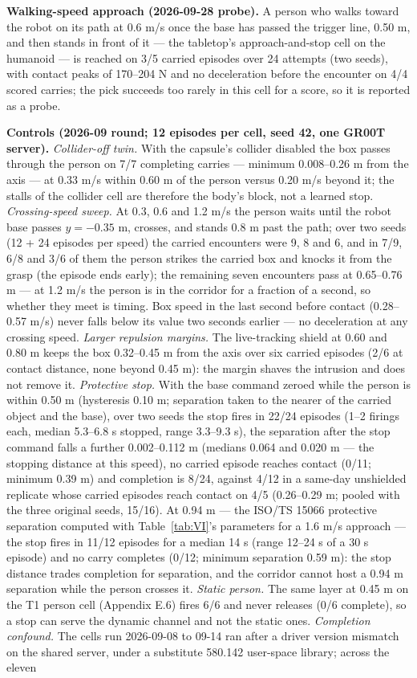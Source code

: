 \textbf{Walking-speed approach (2026-09-28 probe).} A person who walks toward the robot on its path at 0.6 m/s once the base has passed the trigger line, 0.50 m, and then stands in front of it --- the tabletop's approach-and-stop cell on the humanoid --- is reached on 3/5 carried episodes over 24 attempts (two seeds), with contact peaks of 170--204 N and no deceleration before the encounter on 4/4 scored carries; the pick succeeds too rarely in this cell for a score, so it is reported as a probe.

\textbf{Controls (2026-09 round; 12 episodes per cell, seed 42, one GR00T server).} \emph{Collider-off twin.} With the capsule's collider disabled the box passes through the person on 7/7 completing carries --- minimum 0.008--0.26 m from the axis --- at 0.33 m/s within 0.60 m of the person versus 0.20 m/s beyond it; the stalls of the collider cell are therefore the body's block, not a learned stop. \emph{Crossing-speed sweep.} At 0.3, 0.6 and 1.2 m/s the person waits until the robot base passes $y = -0.35$ m, crosses, and stands 0.8 m past the path; over two seeds (12 + 24 episodes per speed) the carried encounters were 9, 8 and 6, and in 7/9, 6/8 and 3/6 of them the person strikes the carried box and knocks it from the grasp (the episode ends early); the remaining seven encounters pass at 0.65--0.76 m --- at 1.2 m/s the person is in the corridor for a fraction of a second, so whether they meet is timing. Box speed in the last second before contact (0.28--0.57 m/s) never falls below its value two seconds earlier --- no deceleration at any crossing speed. \emph{Larger repulsion margins.} The live-tracking shield at 0.60 and 0.80 m keeps the box 0.32--0.45 m from the axis over six carried episodes (2/6 at contact distance, none beyond 0.45 m): the margin shaves the intrusion and does not remove it. \emph{Protective stop.} With the base command zeroed while the person is within 0.50 m (hysteresis 0.10 m; separation taken to the nearer of the carried object and the base), over two seeds the stop fires in 22/24 episodes (1--2 firings each, median 5.3--6.8 s stopped, range 3.3--9.3 s), the separation after the stop command falls a further 0.002--0.112 m (medians 0.064 and 0.020 m --- the stopping distance at this speed), no carried episode reaches contact (0/11; minimum 0.39 m) and completion is 8/24, against 4/12 in a same-day unshielded replicate whose carried episodes reach contact on 4/5 (0.26--0.29 m; pooled with the three original seeds, 15/16). At 0.94 m --- the ISO/TS 15066 protective separation computed with Table~\ref{tab:VI}'s parameters for a 1.6 m/s approach --- the stop fires in 11/12 episodes for a median 14 s (range 12--24 s of a 30 s episode) and no carry completes (0/12; minimum separation 0.59 m): the stop distance trades completion for separation, and the corridor cannot host a 0.94 m separation while the person crosses it. \emph{Static person.} The same layer at 0.45 m on the T1 person cell (Appendix E.6) fires 6/6 and never releases (0/6 complete), so a stop can serve the dynamic channel and not the static ones. \emph{Completion confound.} The cells run 2026-09-08 to 09-14 ran after a driver version mismatch on the shared server, under a substitute 580.142 user-space library; across the eleven 
